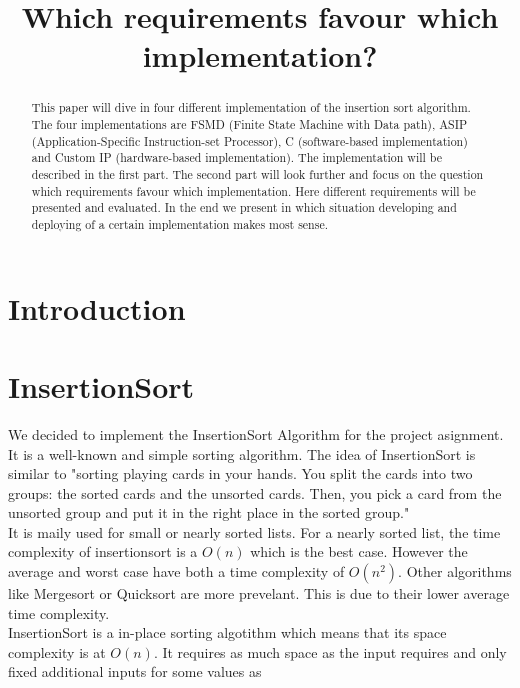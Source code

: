 \documentclass[conference]{IEEEtran}
\begin{document}
\title{Which requirements favour which implementation? \\}

\maketitle

\begin{abstract}
This paper will dive in four different implementation of the insertion sort algorithm. The four implementations are FSMD (Finite State Machine with Data path), ASIP (Application-Specific Instruction-set Processor), C (software-based implementation) and Custom IP (hardware-based implementation). The implementation will be described in the first part. The second part will look further and focus on the question which requirements favour which implementation. Here different requirements will be presented and evaluated. In the end we present in which situation developing and deploying of a certain implementation makes most sense. 
\end{abstract}

\section{Introduction}

\section{InsertionSort}
We decided to implement the InsertionSort Algorithm for the project asignment. It is a well-known and simple sorting algorithm. The idea of InsertionSort is similar to "sorting playing cards in your hands. You split the cards into two groups: the sorted cards and the unsorted cards. Then, you pick a card from the unsorted group and put it in the right place in the sorted group." \cite{g4g}\\
It is maily used for small or nearly sorted lists. For a nearly sorted list, the time complexity of insertionsort is a $O(n)$ which is the best case. However the average and worst case have both a time complexity of $O(n^2)$. Other algorithms like Mergesort or Quicksort are more prevelant. This is due to their lower average time complexity.\\
InsertionSort is a in-place sorting algotithm which means that its space complexity is at $O(n)$. It requires as much space as the input requires and only fixed additional inputs for some values as 
\end{document}
